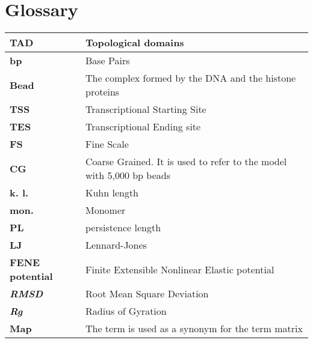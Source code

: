 \section{Glossary} \label{chap: term explanation}

\small{\begin{table}[H]
\begin{tabular}{|l|l|}
\hline
\textbf{TAD} & Topological domains \\
\hline
\textbf{bp} & Base Pairs \\
\hline
\textbf{Bead} & The complex formed by the DNA and the histone proteins \\
\hline
\textbf{TSS} & Transcriptional Starting Site \\
\hline
\textbf{TES} & Transcriptional Ending site \\
\hline
\textbf{FS} & Fine Scale \\
\hline
\textbf{CG} & Coarse Grained. It is used to refer to the model with 5,000 bp beads \\
\hline
\textbf{k. l.} & Kuhn length\\
\hline
\textbf{mon.} & Monomer\\
\hline
\textbf{PL} & persistence length\\
\hline
\textbf{LJ} & Lennard-Jones\\
\hline
\textbf{FENE potential} & Finite Extensible Nonlinear Elastic potential\\
\hline
\textbf{\textit{RMSD}} & Root Mean Square Deviation\\
\hline
\textbf{\textit{Rg}} & Radius of Gyration\\
\hline
\textbf{Map} & The term is used as a synonym for the term matrix\\
\hline
\end{tabular}
\end{table}}